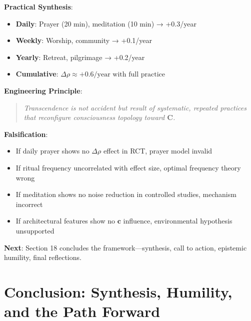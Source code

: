 \documentclass[11pt,a4paper]{article}
\theoremstyle{definition}
\theoremstyle{remark}
\newcommand{\cc}{\mathbf{c}}
\begin{document}
\begin{small}
\begin{enumerate}
\begin{protocol}
\begin{mdframed}[backgroundcolor=green!10,linewidth=2pt,linecolor=green!70!black]
\textbf{Practical Synthesis}:
\begin{itemize}[nosep]
    \item \textbf{Daily}: Prayer (20 min), meditation (10 min) → +0.3/year
    \item \textbf{Weekly}: Worship, community → +0.1/year
    \item \textbf{Yearly}: Retreat, pilgrimage → +0.2/year
    \item \textbf{Cumulative}: \(\Delta\rho \approx +0.6/\text{year with full practice}\)
\end{itemize}

\textbf{Engineering Principle}:
\begin{quote}
\textit{Transcendence is not accident but result of systematic, repeated practices that reconfigure consciousness topology toward \(\mathbf{C}\).}
\end{quote}

\textbf{Falsification}:
\begin{itemize}[nosep]
    \item If daily prayer shows no \(\Delta\rho\) effect in RCT, prayer model invalid
    \item If ritual frequency uncorrelated with effect size, optimal frequency theory wrong
    \item If meditation shows no noise reduction in controlled studies, mechanism incorrect
    \item If architectural features show no \(\cc\) influence, environmental hypothesis unsupported
\end{itemize}

\textbf{Next}: Section 18 concludes the framework—synthesis, call to action, epistemic humility, final reflections.
\end{mdframed}


\section{Conclusion: Synthesis, Humility, and the Path Forward}


\end{protocol}
\end{enumerate}
\end{small}
\end{document}
